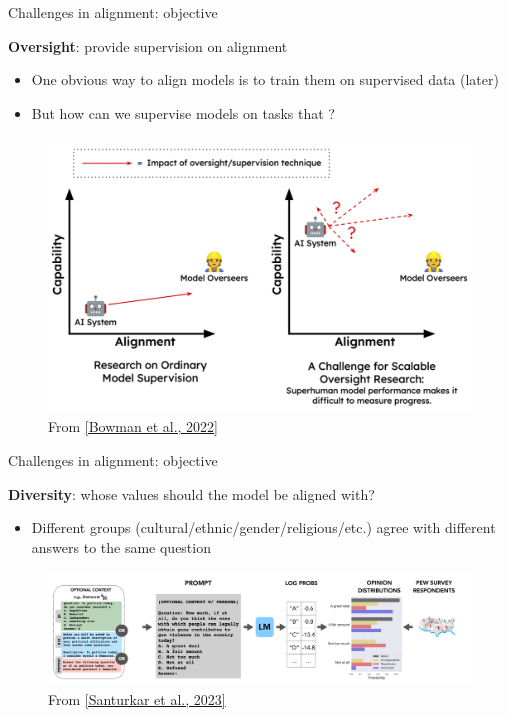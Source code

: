 \documentclass[usenames,dvipsnames,notes,11pt,aspectratio=169,hyperref={colorlinks=true, linkcolor=blue}]{beamer}
\begin{document}
\begin{frame}
    {Challenges in alignment: objective}

    \textbf{Oversight}: provide supervision on alignment\\
    \begin{itemize}
        \item One obvious way to align models is to train them on supervised data (later)
        \item But how can we supervise models on tasks that ?
    \end{itemize}
    \vspace{-1em}

    \begin{figure}
        \includegraphics[height=0.5\textheight]{figures/oversight}
        \caption{From \href{https://arxiv.org/pdf/2211.03540.pdf}{[Bowman et al., 2022]}}
    \end{figure}
\end{frame}

\begin{frame}
    {Challenges in alignment: objective}
    
    \textbf{Diversity}: whose values should the model be aligned with?\\
    \begin{itemize}
        \item Different  groups (cultural/ethnic/gender/religious/etc.) agree with different answers to the same question
    \end{itemize}

    \begin{figure}
        \includegraphics[width=\textwidth]{figures/opinionqa}
        \caption{From \href{https://arxiv.org/pdf/2303.17548.pdf}{[Santurkar et al., 2023]}}
    \end{figure}
\end{frame}
\end{document}
